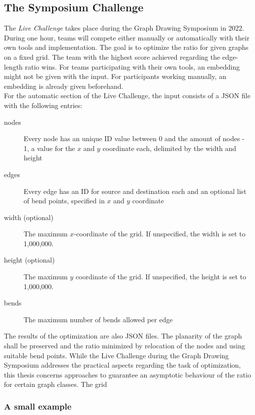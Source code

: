 
\subsection{The Symposium Challenge}

The \emph{Live Challenge} takes place during the Graph Drawing Symposium in 2022. During one hour, teams will compete either manually or automatically with their own tools and implementation. The goal is to optimize the ratio for given graphs on a fixed grid. The team with the highest score achieved regarding the edge-length ratio wins. For teams participating with their own tools, an embedding might not be given with the input. For participants working manually, an embedding is already given beforehand.
\\
For the automatic section of the Live Challenge, the input consists of a JSON file with the following entries:
\begin{description}
	\item[nodes] Every node has an unique ID value between 0 and the amount of nodes - 1, a value for the $x$ and $y$ coordinate each, delimited by the width and height
	\item[edges] Every edge has an ID for source and destination each and an optional list of bend points, specified in $x$ and $y$ coordinate
	\item[width (optional)] The maximum $x$-coordinate of the grid. If unspecified, the width is set to 1,000,000.
	\item[height (optional)] The maximum $y$ coordinate of the grid. If unspecified, the height is set to 1,000,000.
	\item[bends] The maximum number of bends allowed per edge
\end{description}
The results of the optimization are also JSON files. The planarity of the graph shall be preserved and the ratio minimized by relocation of the nodes and using suitable bend points.
\bigskip
While the Live Challenge during the Graph Drawing Symposium addresses the practical aspects regarding the task of optimization, this thesis concerns approaches to guarantee an asymptotic behaviour of the ratio for certain graph classes. The grid 

\subsubsection{A small example}

